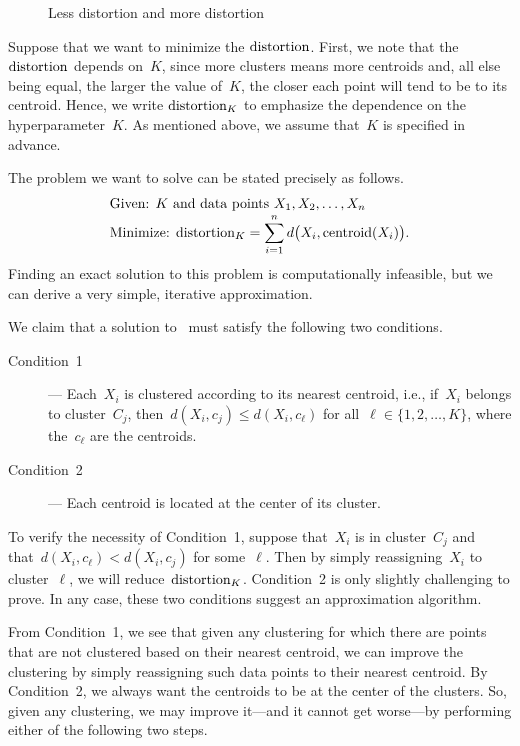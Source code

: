 \documentclass[12pt]{article}
\begin{document}
\begin{figure}[!htb]
\centering
    
\caption{Less distortion and more distortion}\label{fig:clustDistortion}
\end{figure}

Suppose that we want to minimize the $\mbox{distortion}_{}$. 
First, we note that the $\mbox{distortion}_{}$ depends on~$K$, 
since more clusters means more centroids and, all else being equal, 
the larger the value of~$K$, the closer each point will tend to
be to its centroid. Hence, we write $\mbox{distortion}_{K}$ to emphasize the 
dependence on the hyperparameter~$K$. As mentioned above, 
we assume that~$K$ is specified in advance.

The problem we want to solve can be stated precisely as follows.
\begin{equation}\label{eq:clustProb}
\begin{split}
  & \mbox{Given: } K \mbox{ and data points } X_1,X_2,\ldots, X_n\\[-0.75ex]
  & \mbox{Minimize: } \mbox{distortion}_{K} =  \sum_{i=1}^n d\bigl(X_i,\mbox{centroid}(X_i)\bigr) .
\end{split}
\end{equation}
Finding an exact solution to this problem is computationally infeasible,
but we can derive a very simple, iterative approximation.

We claim that a solution to~ must satisfy the following two conditions.
\begin{description}
\item[Condition~1]--- Each~$X_i$ is clustered according to its nearest centroid,
i.e., if~$X_i$ belongs to cluster~$C_j$, 
then~$d(X_i,c_j) \leq d(X_i,c_{\ell})$ for all~$\ell\in\{1,2,\ldots,K\}$,
where the~$c_{\ell}$ are the centroids.
\item[Condition~2]--- Each centroid is located at the center of its cluster.
\end{description}

To verify the necessity of Condition~1,
suppose that~$X_i$ is in cluster~$C_j$ and that~$d(X_i,c_{\ell}) < d(X_i,c_{j})$ 
for some~$\ell$. Then by simply reassigning~$X_i$ to cluster~$\ell$, we 
will reduce~$\mbox{distortion}_{K}$.
Condition~2  is only slightly challenging to prove.
In any case, these two conditions suggest an approximation 
algorithm.

From Condition~1, we see that given any clustering for which there are 
points that are not clustered based on
their nearest centroid, we can improve the clustering by simply reassigning
such data points to their nearest centroid. By Condition~2,
we always want the centroids to be at the center of the clusters. So, given any
clustering, we may improve it---and it cannot get worse---by performing 
either of the following two steps.
\end{document}
